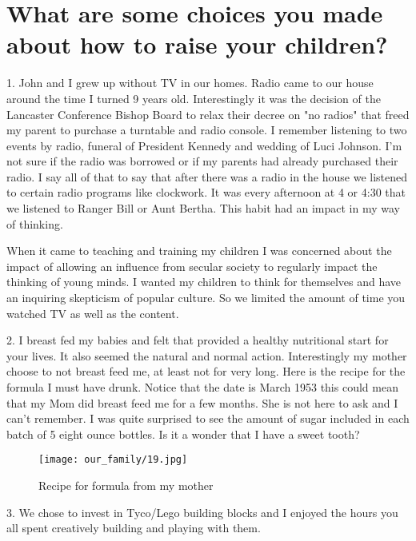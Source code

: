 \section{What are some choices you made about how to raise your children?}
    1. John and I grew up without TV in our homes. 
Radio came to our house around the time I turned 9 years old. 
Interestingly it was the decision of the Lancaster Conference Bishop Board to relax their decree on "no radios" that freed my parent to purchase a turntable and radio console. 
I remember listening to two events by radio, funeral of President Kennedy and wedding of Luci Johnson.  
I'm not sure if the radio was borrowed or if my parents had already purchased their radio. 
I say all of that to say that after there was a radio in the house we listened to certain radio programs like clockwork. 
It was every afternoon at 4 or 4:30 that we listened to Ranger Bill or Aunt Bertha. 
This habit had an impact in my way of thinking. 

When it came to teaching and training my children I was concerned about the impact of allowing an influence from secular society to regularly impact the thinking of young minds. 
I wanted my children to think for themselves and have an inquiring skepticism of popular culture. 
So we limited the amount of time you watched TV as well as the content.

    2. I breast fed my babies and felt that provided a healthy nutritional start for your lives. 
It also seemed the natural and normal action. 
Interestingly my mother choose to not breast feed me, at least not for very long. 
Here is the recipe for the formula I must have drunk. 
Notice that the date is March 1953 this could mean that my Mom did breast feed me for a few months. 
She is not here to ask and I can't remember. 
I was quite surprised to see the amount of sugar included in each batch of 5 eight ounce bottles. 
Is it a wonder that I have a sweet tooth?

\begin{figure}
\centering
\texttt{[image: our\_family/19.jpg]}
\caption{
Recipe for formula from my mother
}
\end{figure}

    3. We chose to invest in Tyco/Lego building blocks and I enjoyed the hours you all spent creatively building and playing with them.





